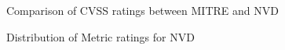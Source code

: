 \documentclass[12pt]{article}
\begin{document}
\begin{figure}
	\centering
	\caption{\label{fig:counts}Comparison of CVSS ratings between MITRE and NVD}
\end{figure}

\begin{figure}
	\centering
	\caption{\label{fig:nvd_data}Distribution of Metric ratings for NVD}
\end{figure}
\end{document}

